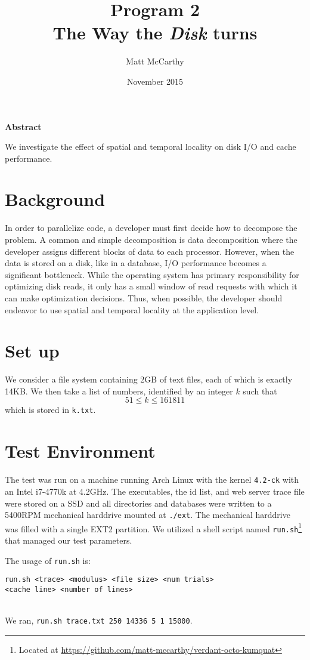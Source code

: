 \documentclass[notitlepage, twocolumn]{article}
\title{\bf
Program 2\\
The Way the \textit{Disk} turns
}
\date{November 2015}
\author{
Matt McCarthy
}
\affil{Christopher Newport University\\
\texttt{\href{mailto:matthew.mccarthy.12@cnu.edu}{matthew.mccarthy.12@cnu.edu}}
}
\begin{document}
\maketitle

\noindent\textbf{Abstract}

\noindent We investigate the effect of spatial and temporal locality on disk I/O and cache performance.

\section{Background}

In order to parallelize code, a developer must first decide how to decompose the problem.
A common and simple decomposition is data decomposition where the developer assigns different blocks of data to each processor.
However, when the data is stored on a disk, like in a database, I/O performance becomes a significant bottleneck.
While the operating system has primary responsibility for optimizing disk reads, it only has a small window of read requests with which it can make optimization decisions.
Thus, when possible, the developer should endeavor to use spatial and temporal locality at the application level.

\section{Set up}

We consider a file system containing 2GB of text files, each of which is exactly 14KB.
We then take a list of numbers, identified by an integer $k$ such that
\[
	51 \leq k \leq 161811
\]
which is stored in \verb|k.txt|.

\section{Test Environment}

The test was run on a machine running Arch Linux with the kernel \verb|4.2-ck| with an Intel i7-4770k at 4.2GHz.
The executables, the id list, and web server trace file were stored on a SSD and all directories and databases were written to a 5400RPM mechanical harddrive mounted at \verb|./ext|.
The mechanical harddrive was filled with a single EXT2 partition.
We utilized a shell script named \verb|run.sh|\footnote{Located at \url{https://github.com/matt-mccarthy/verdant-octo-kumquat}} that managed our test parameters.

The usage of \verb|run.sh| is:\\
\begin{footnotesize}
\verb|run.sh <trace> <modulus> <file size> <num trials>|\\
\verb|<cache line> <number of lines>|
\end{footnotesize}\\
We ran, \verb|run.sh trace.txt 250 14336 5 1 15000|.
\end{document}
